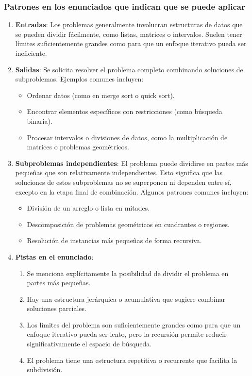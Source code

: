 \subsubsection{Patrones en los enunciados que indican que se puede aplicar}  
\begin{enumerate}  
  \item \textbf{Entradas}:  
  Los problemas generalmente involucran estructuras de datos que se pueden dividir fácilmente, como listas, matrices o intervalos. Suelen tener límites suficientemente grandes como para que un enfoque iterativo pueda ser ineficiente.  

  \item \textbf{Salidas}:  
  Se solicita resolver el problema completo combinando soluciones de subproblemas. Ejemplos comunes incluyen:  
  \begin{itemize}  
    \item Ordenar datos (como en merge sort o quick sort).  
    \item Encontrar elementos específicos con restricciones (como búsqueda binaria).  
    \item Procesar intervalos o divisiones de datos, como la multiplicación de matrices o problemas geométricos.  
  \end{itemize}  

  \item \textbf{Subproblemas independientes}:  
  El problema puede dividirse en partes más pequeñas que son relativamente independientes. Esto significa que las soluciones de estos subproblemas no se superponen ni dependen entre sí, excepto en la etapa final de combinación. Algunos patrones comunes incluyen:  
  \begin{itemize}  
    \item División de un arreglo o lista en mitades.  
    \item Descomposición de problemas geométricos en cuadrantes o regiones.  
    \item Resolución de instancias más pequeñas de forma recursiva.  
  \end{itemize}  

\item \textbf{Pistas en el enunciado}:  
  \begin{enumerate}  
    \item Se menciona explícitamente la posibilidad de dividir el problema en partes más pequeñas.  
    \item Hay una estructura jerárquica o acumulativa que sugiere combinar soluciones parciales.  
    \item Los límites del problema son suficientemente grandes como para que un enfoque iterativo pueda ser lento, pero la recursión permite reducir significativamente el espacio de búsqueda.  
    \item El problema tiene una estructura repetitiva o recurrente que facilita la subdivisión.  
  \end{enumerate}  
\end{enumerate}  

